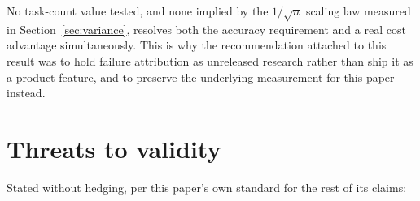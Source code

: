 \documentclass[11pt]{article}
\begin{document}
No task-count value tested, and none implied by the
$1/\sqrt{n}$ scaling law measured in Section~\ref{sec:variance}, resolves both the accuracy
requirement and a real cost advantage simultaneously. This is why the recommendation attached to
this result was to hold failure attribution as unreleased research rather than ship it as a
product feature, and to preserve the underlying measurement for this paper instead.

\section{Threats to validity}
\label{sec:threats}

Stated without hedging, per this paper's own standard for the rest of its claims:
\end{document}
